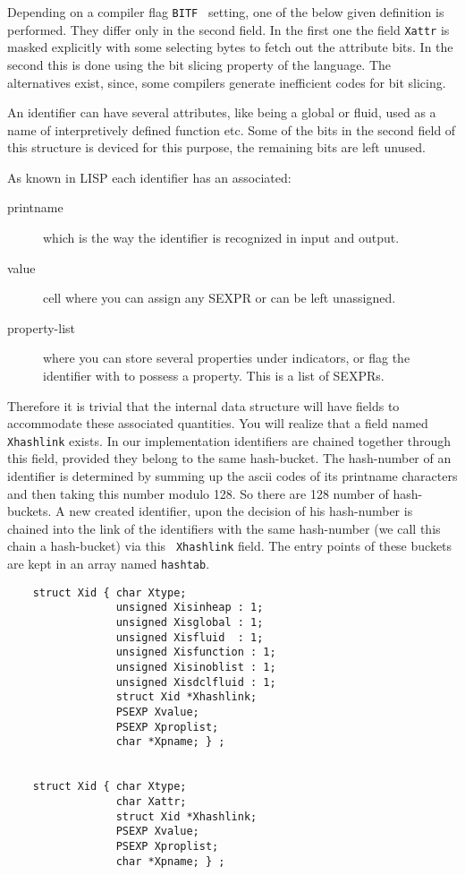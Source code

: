 Depending on a compiler flag {\tt BITF } setting, one of the below  given
definition  is performed. They differ only in the second field. In the first
one the field {\tt Xattr} is masked explicitly with some selecting  bytes
to  fetch  out the attribute bits. In the second this is done using the bit
slicing property of the \C language. The alternatives  exist,  since,  some
compilers generate inefficient codes for bit slicing.

An identifier can have several attributes, like being a  global  or  fluid,
used  as a name of interpretively defined function etc. Some of the bits in
the second field of  this  structure  is  deviced  for  this  purpose,  the
remaining bits are left unused.

As known in LISP each identifier has an associated:
\begin{description}
  \item[printname]  which is the way the identifier is recognized in
                     input and output.
  \item[value] cell where you can  assign any SEXPR or can be left
                    unassigned.
  \item[property-list] where you can store several  properties  under
                     indicators, or  flag  the identifier with to possess a
                     property. This is a list of SEXPRs.
\end{description}

Therefore it is trivial that the internal data structure will  have  fields
to  accommodate  these  associated quantities. You will realize that a field
named {\tt Xhashlink} exists. In our implementation identifiers are chained
together through this field, provided they belong to the same  hash-bucket.
The hash-number of an identifier is determined  by  summing  up  the  ascii
codes  of  its printname characters and then taking this number modulo 128.
So there are 128 number of hash-buckets. A new created identifier, upon the
decision of his hash-number is chained into the  link  of  the  identifiers
with  the same hash-number (we call this chain a hash-bucket) via this {\tt
Xhashlink} field. The entry points of these buckets are kept  in  an  array
named {\tt hashtab}.

\begin{verbatim}
    struct Xid { char Xtype;
                 unsigned Xisinheap : 1;
                 unsigned Xisglobal : 1;
                 unsigned Xisfluid  : 1;
                 unsigned Xisfunction : 1;
                 unsigned Xisinoblist : 1;
                 unsigned Xisdclfluid : 1;
                 struct Xid *Xhashlink;
                 PSEXP Xvalue;
                 PSEXP Xproplist;
                 char *Xpname; } ;


    struct Xid { char Xtype;
                 char Xattr;
                 struct Xid *Xhashlink;
                 PSEXP Xvalue;
                 PSEXP Xproplist;
                 char *Xpname; } ;
\end{verbatim}

